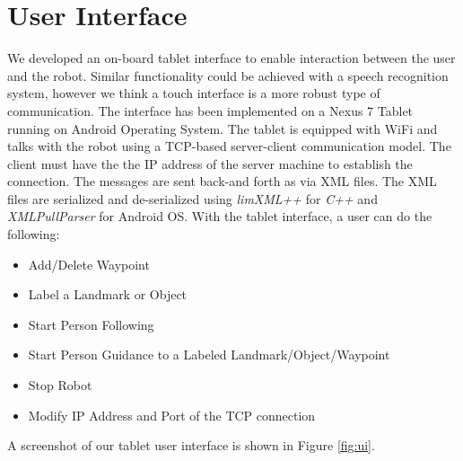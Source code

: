 \documentclass[12pt]{gatech-thesis}
\begin{document}
\section{User Interface}
\label{sec:map_ui}

We developed an on-board tablet interface to enable interaction between the user and the robot. Similar functionality could be achieved with a speech recognition system, however we think a touch interface is a more robust type of communication. The interface has been implemented on a Nexus 7 Tablet running on Android Operating System. The tablet is equipped with WiFi and talks with the robot using a TCP-based server-client communication model. The client must have the the IP address of the server machine to establish the connection. The messages are sent back-and forth as via XML files. The XML files are serialized and de-serialized using \textit{limXML++} for \textit{C++} and \textit{XMLPullParser} for Android OS. With the tablet interface, a user can do the following:

\begin{itemize}
\item Add/Delete Waypoint
\item Label a Landmark or Object
\item Start Person Following
\item Start Person Guidance to a Labeled Landmark/Object/Waypoint
\item Stop Robot
\item Modify IP Address and Port of the TCP connection
\end{itemize}

A screenshot of our tablet user interface is shown in Figure \ref{fig:ui}.
\end{document}
